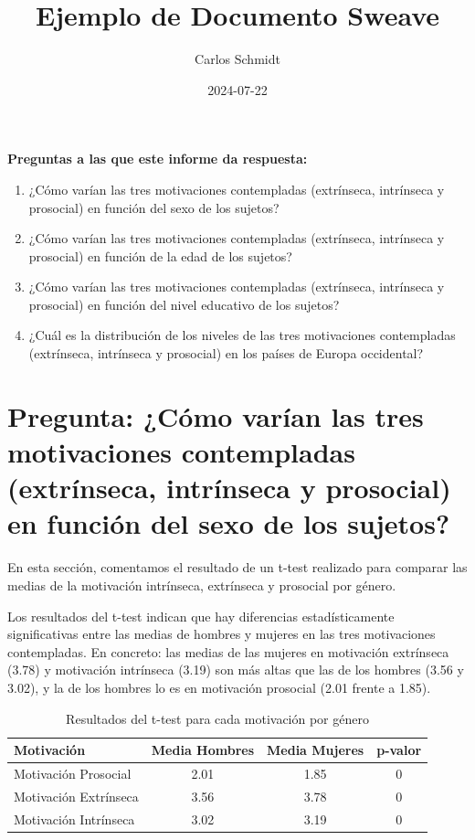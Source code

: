 \documentclass{article}
\title{Ejemplo de Documento Sweave}
\author{Carlos Schmidt}
\date{2024-07-22}
\begin{document}


\maketitle



\textbf{Preguntas a las que este informe da respuesta:}
\begin{enumerate}
    \item ¿Cómo varían las tres motivaciones contempladas (extrínseca, intrínseca y prosocial) en función del sexo de los sujetos?
    \item ¿Cómo varían las tres motivaciones contempladas (extrínseca, intrínseca y prosocial) en función de la edad de los sujetos?
    \item ¿Cómo varían las tres motivaciones contempladas (extrínseca, intrínseca y prosocial) en función del nivel educativo de los sujetos?
    \item ¿Cuál es la distribución de los niveles de las tres motivaciones contempladas (extrínseca, intrínseca y prosocial) en los países de Europa occidental?
\end{enumerate}





\section{Pregunta: ¿Cómo varían las tres motivaciones contempladas (extrínseca, intrínseca y prosocial) en función del sexo de los sujetos?
}

En esta sección, comentamos el resultado de un t-test realizado para comparar las medias de la motivación intrínseca, extrínseca y prosocial por género.


Los resultados del t-test indican que hay diferencias estadísticamente significativas entre las medias de hombres y mujeres en las tres motivaciones contempladas. En concreto: las medias de las mujeres en motivación extrínseca (3.78) y motivación intrínseca (3.19) son más altas que las de los hombres (3.56 y 3.02), y la de los hombres lo es en motivación prosocial (2.01 frente a 1.85).

\begin{table}[h!]
\centering
\caption{Resultados del t-test para cada motivación por género}
\begin{tabular}{lccc}
  \toprule
  \textbf{Motivación} & \textbf{Media Hombres} & \textbf{Media Mujeres} & \textbf{p-valor} \\
  \midrule
  Motivación Prosocial & 2.01 & 1.85 & 0 \\
  Motivación Extrínseca & 3.56 & 3.78 & 0 \\
  Motivación Intrínseca & 3.02 & 3.19 & 0 \\
  \bottomrule
\end{tabular}
\end{table}
\end{document}
